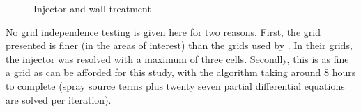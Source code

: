 \documentclass[a4paper,10pt]{article}
\begin{document}
\begin{figure}[H]
\centering
{}
\caption{Injector and wall treatment}
\end{figure}
No grid independence testing is given here for two reasons. First, the grid presented is finer (in the areas of interest) than the grids used by \cite{beck2003,lemini2004}. In their grids, the injector was resolved with a maximum of three cells. Secondly, this is as fine a grid as can be afforded for this study, with the algorithm taking around 8 hours to complete (spray source terms plus twenty seven partial differential equations are solved per iteration).



\end{document}
